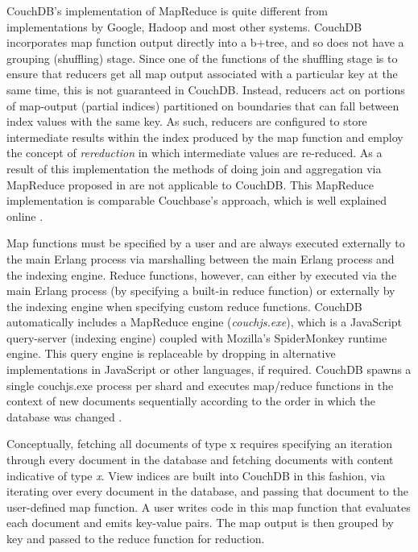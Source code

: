 CouchDB's implementation of MapReduce is quite different from implementations by Google, Hadoop and most other systems. CouchDB incorporates map function output directly into a b+tree, and so does not have a grouping (shuffling) stage. Since one of the functions of the shuffling stage is to ensure that reducers get all map output associated with a particular key at the same time, this is not guaranteed in CouchDB. Instead, reducers act on portions of map-output (partial indices) partitioned on boundaries that can fall between index values with the same key. As such, reducers are configured to store intermediate results within the index produced by the map function and employ the concept of \textit{rereduction} in which intermediate values are re-reduced. As a result of this implementation the methods of doing join and aggregation via MapReduce proposed in \cite{mining2011} are not applicable to CouchDB. This MapReduce implementation is comparable Couchbase's approach, which is well explained online \cite{couchbaseRereduce}.

Map functions must be specified by a user and are always executed externally to the main Erlang process via marshalling between the main Erlang process and the indexing engine. Reduce functions, however, can either by executed via the main Erlang process (by specifying a built-in reduce function) or externally by the indexing engine when specifying custom reduce functions. CouchDB automatically includes a MapReduce engine (\textit{couchjs.exe}), which is a JavaScript query-server (indexing engine) coupled with Mozilla's SpiderMonkey runtime engine. This query engine is replaceable by dropping in alternative implementations in JavaScript or other languages, if required. CouchDB spawns a single couchjs.exe process per shard and executes map/reduce functions in the context of new documents sequentially according to the order in which the database was changed \cite{slack2Nov,slack7Nov}.

Conceptually, fetching all documents of type x requires specifying an iteration through every document in the database and fetching documents with content indicative of type \textit{x}. View indices are built into CouchDB in this fashion, via iterating over every document in the database, and passing that document to the user-defined map function. A user writes code in this map function that evaluates each document and emits key-value pairs. The map output is then grouped by key and passed to the reduce function for reduction.

